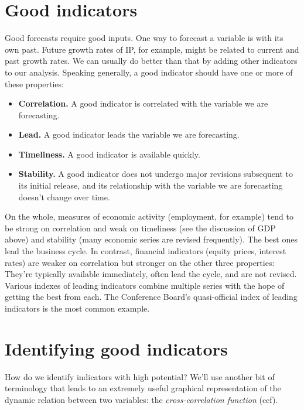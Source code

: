 \section{Good indicators}

Good forecasts require good inputs.
One way to forecast a variable is with its own past.
Future growth rates of IP, for example, might be related
to current and past growth rates.
We can usually do better than that by adding other indicators
to our analysis.
Speaking generally,
a good indicator should have one or more of these properties:
%
\begin{itemize}

\item \textbf{Correlation.}  A good indicator is correlated with the
variable we are forecasting.

\item \textbf{Lead.} A good indicator leads the variable we are
forecasting.

\item \textbf{Timeliness.}  A good indicator is available quickly.

\item\textbf{Stability.}  A good indicator does not undergo major
revisions subsequent to its initial release, and its
relationship with the variable we are forecasting doesn't
change over time.

\end{itemize}
On the whole, measures of economic activity
(employment, for example)
tend to be strong on correlation and weak on timeliness (see the
discussion of GDP above) and stability (many economic series are
revised frequently).  The best ones lead the business cycle.  In
contrast, financial indicators (equity prices, interest rates) are
weaker on correlation but stronger on the other three properties:
They're typically available immediately, often lead the cycle, and
are not revised.
Various indexes of leading indicators combine multiple series with the
hope of getting the best from each.  The Conference Board's
quasi-official index of leading indicators is the most common example.



\section{Identifying good indicators}

How do we identify indicators with high potential?
We'll use another bit of terminology that leads to an extremely useful
graphical representation of the dynamic relation between two variables:
the {\it cross-correlation function\/} (ccf).

